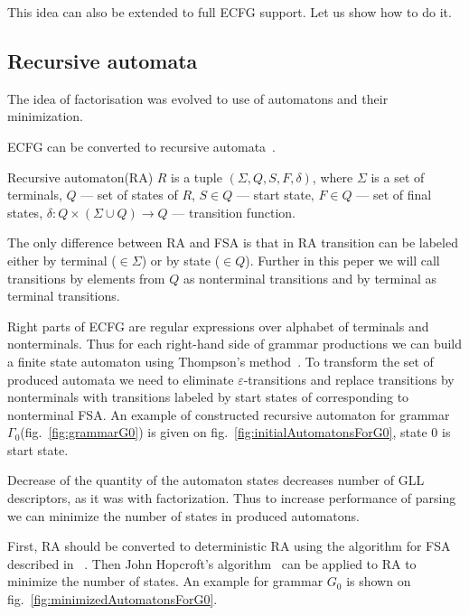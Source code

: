 \documentclass[runningheads,a4paper]{llncs}
\begin{document}
This idea can also be extended to full ECFG support.
Let us show how to do it.

\subsection{Recursive automata}
The idea of factorisation was evolved to use of automatons and their minimization.

ECFG can be converted to recursive automata~\cite{tellier2006learning}.

\begin{mydef}
    Recursive automaton(RA) $R$ is a tuple $(\Sigma, Q, S, F, \delta)$, where
    $\Sigma$ is a set of terminals,
    $Q$ --- set of states of $R$,
    $S \in Q$ --- start state,
    $F \in Q$ --- set of final states,
    $\delta : Q \times (\Sigma \cup Q) \to Q$ --- transition function.
\end{mydef}

The only difference between RA and FSA is that in RA transition can be labeled either 
by terminal ($\in \Sigma$) or by state ($\in Q$). Further in this peper we will call
transitions by elements from $Q$ as nonterminal transitions and by terminal as terminal transitions.

Right parts of ECFG are regular expressions over alphabet of terminals and nonterminals.
Thus for each right-hand side of grammar productions we can build a finite state automaton 
using Thompson's method~\cite{Thompson:1968:PTR:363347.363387}. 
To transform the set of produced automata we need to eliminate $\varepsilon$-transitions and replace
transitions by nonterminals with transitions labeled by start states of corresponding to nonterminal FSA.
An example of constructed recursive automaton for grammar $\Gamma_{0}$(fig.~\ref{fig:grammarG0})
is given on fig.~\ref{fig:initialAutomatonsForG0}, state 0 is start state.

Decrease of the quantity of the automaton states decreases number of GLL descriptors, as it was with factorization.
Thus to increase performance of parsing we can minimize the number of states in produced automatons.

First, RA should be converted to deterministic RA using the algorithm for FSA described in ~\cite{aho1974design}.
Then John Hopcroft's algorithm~\cite{hopcroft1971n} can be applied to RA to minimize the number of states.
An example for grammar $G_0$ is shown on fig.~\ref{fig:minimizedAutomatonsForG0}.
\end{document}
